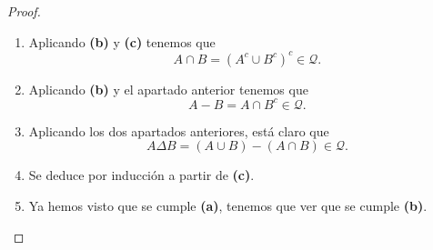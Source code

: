 \begin{proof}
\begin{enumerate}
\item Aplicando \textbf{(b)} y \textbf{(c)} tenemos que 
	\[ A \cap B = \left(A^{c} \cup B^{c}\right)^{c} \in \mathcal{Q} .\]
\item Aplicando \textbf{(b)} y el apartado anterior tenemos que
	\[A - B = A \cap B^{c} \in \mathcal{Q} .\]
\item Aplicando los dos apartados anteriores, está claro que
	\[A \Delta B = \left(A \cup B\right) - \left(A \cap B\right) \in \mathcal{Q} .\]
\item Se deduce por inducción a partir de \textbf{(c)}.
\item Ya hemos visto que se cumple \textbf{(a)}, tenemos que ver que se cumple \textbf{(b)}.
\end{enumerate}

\end{proof}


